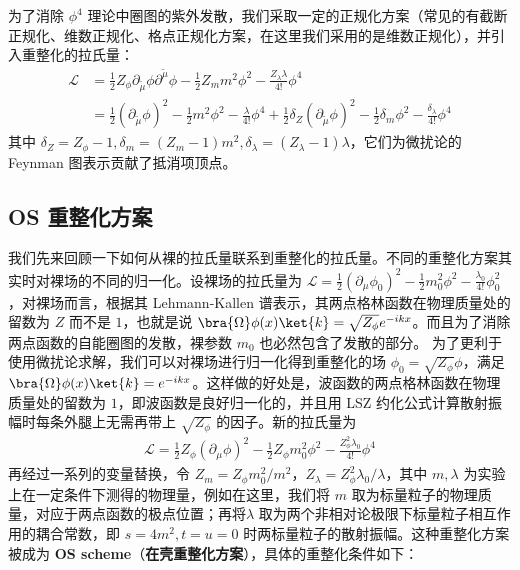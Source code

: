 为了消除 $\phi^4$ 理论中圈图的紫外发散，我们采取一定的正规化方案（常见的有截断正规化、维数正规化、格点正规化方案，在这里我们采用的是维数正规化），并引入重整化的拉氏量：
\begin{equation}
\begin{aligned}
\mathcal{L}
&=\frac{1}{2}Z_\phi \partial_\tilde{\mu} \phi \partial^\tilde{\mu} \phi - \frac{1}{2} Z_m m^2\phi^2 - \frac{Z_\lambda \lambda}{4!}\phi^4\\
&=\frac{1}{2}(\partial_\tilde{\mu}\phi)^2 - \frac{1}{2}m^2\phi^2 - \frac{\lambda}{4!}\phi^4+\frac{1}{2}\delta_Z (\partial_\tilde{\mu} \phi)^2 - \frac{1}{2}\delta_m \phi^2 - \frac{\delta_\lambda}{4!}\phi^4
\end{aligned}
\end{equation}
其中 $\delta_Z=Z_\phi-1,\delta_m = (Z_m-1)m^2,\delta_\lambda = (Z_\lambda-1)\lambda$，它们为微扰论的 Feynman 图表示贡献了抵消项顶点。

\subsection{OS 重整化方案}
我们先来回顾一下如何从裸的拉氏量联系到重整化的拉氏量。不同的重整化方案其实时对裸场的不同的归一化。设裸场的拉氏量为 $\mathcal{L}=\frac{1}{2} (\partial_\mu \phi_0)^2 - \frac{1}{2} m_0^2 \phi^2 - \frac{\lambda_0}{4!}\phi_0^2$，对裸场而言，根据其 Lehmann-Kallen 谱表示，其两点格林函数在物理质量处的留数为 $Z$ 而不是 $1$，也就是说 $\bra{\Omega}\phi(x) \ket{k}=\sqrt{Z_\phi}e^{-ikx}$。而且为了消除两点函数的自能圈图的发散，裸参数 $m_0$ 也必然包含了发散的部分。
为了更利于使用微扰论求解，我们可以对裸场进行归一化得到重整化的场 $\phi_0 = \sqrt{Z_\phi}\phi$，满足 $\bra{\Omega}\phi(x)\ket{k} = e^{-ikx}$。这样做的好处是，波函数的两点格林函数在物理质量处的留数为 $1$，即波函数是良好归一化的，并且用 LSZ 约化公式计算散射振幅时每条外腿上无需再带上 $\sqrt{Z_\phi}$ 的因子。新的拉氏量为
\begin{equation}
\begin{aligned}
\mathcal{L} = \frac{1}{2}Z_\phi (\partial_\mu\phi)^2 - \frac{1}{2} Z_\phi m_0^2 \phi^2 - \frac{Z_\phi^2\lambda_0}{4!} \phi^4
\end{aligned}
\end{equation}
再经过一系列的变量替换，令 $Z_m = Z_\phi m_0^2/m^2$，$Z_\lambda = Z_\phi^2 \lambda_0/\lambda$，其中 $m,\lambda$ 为实验上在一定条件下测得的物理量，例如在这里，我们将 $m$ 取为标量粒子的物理质量，对应于两点函数的极点位置；再将$\lambda$ 取为两个非相对论极限下标量粒子相互作用的耦合常数，即 $s=4m^2,t=u=0$ 时两标量粒子的散射振幅。这种重整化方案被成为 \textbf{OS scheme}（\textbf{在壳重整化方案}），具体的重整化条件如下：

